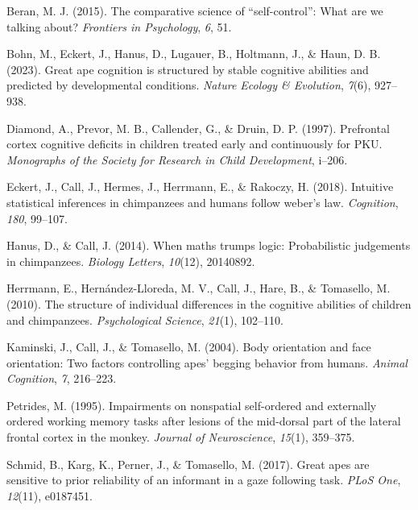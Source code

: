 \documentclass[
  man,floatsintext]{apa6}
\newlength{\cslhangindent}
\newlength{\cslentryspacingunit} %
\newenvironment{CSLReferences}[2] %
 {%
  \setlength{\parindent}{0pt}
  \ifodd #1
  \let\oldpar\par
  \def\par{\hangindent=\cslhangindent\oldpar}
  \fi
  \setlength{\parskip}{#2\cslentryspacingunit}
 }%
 {}
\begin{document}
\hypertarget{refs}{}
\begin{CSLReferences}{1}{0}
\leavevmode{}%
Beran, M. J. (2015). The comparative science of {``self-control''}: What are we talking about? \emph{Frontiers in Psychology}, \emph{6}, 51.

\leavevmode{}%
Bohn, M., Eckert, J., Hanus, D., Lugauer, B., Holtmann, J., \& Haun, D. B. (2023). Great ape cognition is structured by stable cognitive abilities and predicted by developmental conditions. \emph{Nature Ecology \& Evolution}, \emph{7}(6), 927--938.

\leavevmode{}%
Diamond, A., Prevor, M. B., Callender, G., \& Druin, D. P. (1997). Prefrontal cortex cognitive deficits in children treated early and continuously for PKU. \emph{Monographs of the Society for Research in Child Development}, i--206.

\leavevmode{}%
Eckert, J., Call, J., Hermes, J., Herrmann, E., \& Rakoczy, H. (2018). Intuitive statistical inferences in chimpanzees and humans follow weber's law. \emph{Cognition}, \emph{180}, 99--107.

\leavevmode{}%
Hanus, D., \& Call, J. (2014). When maths trumps logic: Probabilistic judgements in chimpanzees. \emph{Biology Letters}, \emph{10}(12), 20140892.

\leavevmode{}%
Herrmann, E., Hernández-Lloreda, M. V., Call, J., Hare, B., \& Tomasello, M. (2010). The structure of individual differences in the cognitive abilities of children and chimpanzees. \emph{Psychological Science}, \emph{21}(1), 102--110.

\leavevmode{}%
Kaminski, J., Call, J., \& Tomasello, M. (2004). Body orientation and face orientation: Two factors controlling apes' begging behavior from humans. \emph{Animal Cognition}, \emph{7}, 216--223.

\leavevmode{}%
Petrides, M. (1995). Impairments on nonspatial self-ordered and externally ordered working memory tasks after lesions of the mid-dorsal part of the lateral frontal cortex in the monkey. \emph{Journal of Neuroscience}, \emph{15}(1), 359--375.

\leavevmode{}%
Schmid, B., Karg, K., Perner, J., \& Tomasello, M. (2017). Great apes are sensitive to prior reliability of an informant in a gaze following task. \emph{PLoS One}, \emph{12}(11), e0187451.


\end{CSLReferences}
\end{document}
